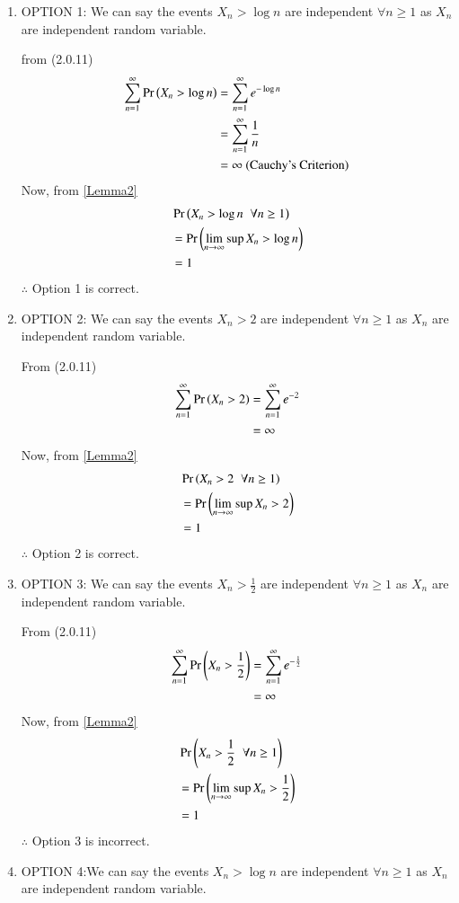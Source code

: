 \documentclass[journal,12pt,twocolumn]{IEEEtran}
\begin{document}
\begin{enumerate}
    \item OPTION 1: 
    We can say the events $X_n>\log n$ are independent $\forall n\geq 1$ as $X_n$ are independent random variable.
    
   from (2.0.11)
    \begin{align}
        \sum_{n=1}^{\infty}\Pr\left(X_n > \log n\right) &=\sum_{n=1}^{\infty}e^{-\log n}\\ &=\sum_{n=1}^{\infty}\frac{1}{n}\\
        &= \infty\text{ (Cauchy's Criterion)}  
    \end{align}
    Now, from \eqref{Lemma2}
    \begin{align}
        &\Pr\left(X_n>\log n\hspace{0.2cm} \forall n\geq1\right)\\
        &=\Pr\left(\lim_{n \rightarrow \infty}\sup X_n>\log n\right)\\
        &=1
    \end{align}
    $\therefore$ Option 1 is correct. 
    
    \item OPTION 2: We can say the events $X_n>2$ are independent $\forall n\geq 1$ as $X_n$ are independent random variable.
    
    From (2.0.11)
    \begin{align}
        \sum_{n=1}^{\infty}\Pr\left(X_n > 2\right) &= \sum_{n=1}^{\infty}e^{-2}\\
                                            &= \infty
    \end{align}
    Now, from \eqref{Lemma2}
    \begin{align}
        &\Pr\left(X_n>2 \hspace{0.2cm} \forall n\geq1\right)\\
        &=\Pr\left(\lim_{n \rightarrow \infty}\sup X_n>2\right)\\
        &=1
    \end{align}
    $\therefore$ Option 2 is correct.
    
    \item OPTION 3: We can say the events $X_n>\frac{1}{2}$ are independent $\forall n\geq 1$ as $X_n$ are independent random variable.
    
    From (2.0.11)
    \begin{align}
        \sum_{n=1}^{\infty}\Pr\left(X_n > \frac{1}{2}\right) &= \sum_{n=1}^{\infty}e^{-\frac{1}{2}}\\
                                            &= \infty
    \end{align}
    Now, from \eqref{Lemma2}
    \begin{align}
        &\Pr\left(X_n>\frac{1}{2} \hspace{0.2cm} \forall n\geq1\right)\\
        &=\Pr\left(\lim_{n \rightarrow \infty}\sup X_n>\frac{1}{2}\right)\\
        &=1
    \end{align}
    $\therefore$ Option 3 is incorrect.
    \item OPTION 4:We can say the events $X_n>\log n$ are independent $\forall n\geq 1$ as $X_n$ are independent random variable.
    

\end{enumerate}
\end{document}
